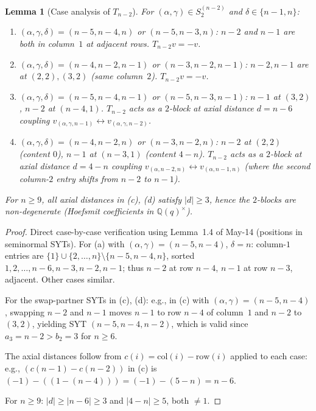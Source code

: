 \documentclass[11pt]{article}
\newtheorem{lemma}[theorem]{Lemma}
\theoremstyle{definition}
\begin{document}
\begin{lemma}[Case analysis of $T_{n-2}$]\label{lem:Tn2-cases}
For $(\alpha,\gamma)\in S_2^{(n-2)}$ and $\delta\in\{n-1,n\}$:
\begin{enumerate}[leftmargin=2em,topsep=0.3em,itemsep=0.2em,
label=\textup{(\alph*)}]
\item $(\alpha,\gamma,\delta)=(n{-}5,n{-}4,n)$ or
$(n{-}5,n{-}3,n)$: $n-2$ and $n-1$ are both in column~$1$ at
adjacent rows.  $T_{n-2}v=-v$.
\item $(\alpha,\gamma,\delta)=(n{-}4,n{-}2,n{-}1)$ or
$(n{-}3,n{-}2,n{-}1)$: $n-2,n-1$ are at $(2,2),(3,2)$ (same
column~$2$).  $T_{n-2}v=-v$.
\item $(\alpha,\gamma,\delta)=(n{-}5,n{-}4,n{-}1)$ or
$(n{-}5,n{-}3,n{-}1)$: $n-1$ at $(3,2)$, $n-2$ at $(n{-}4,1)$.
$T_{n-2}$ acts as a $2$-block at axial distance $d=n-6$ coupling
$v_{(\alpha,\gamma,n-1)}\leftrightarrow v_{(\alpha,\gamma,n-2)}$.
\item $(\alpha,\gamma,\delta)=(n{-}4,n{-}2,n)$ or
$(n{-}3,n{-}2,n)$: $n-2$ at $(2,2)$ (content $0$), $n-1$ at
$(n{-}3,1)$ (content $4-n$).  $T_{n-2}$ acts as a $2$-block at
axial distance $d=4-n$ coupling
$v_{(\alpha,n-2,n)}\leftrightarrow v_{(\alpha,n-1,n)}$ (where the
second column-$2$ entry shifts from $n-2$ to $n-1$).
\end{enumerate}
For $n\ge 9$, all axial distances in (c), (d) satisfy
$|d|\ge 3$, hence the $2$-blocks are non-degenerate
(Hoefsmit coefficients in $\mathbb{Q}(q)^\times$).
\end{lemma}

\begin{proof}
Direct case-by-case verification using Lemma~1.4 of May-14
(positions in seminormal SYTs).  For (a) with
$(\alpha,\gamma)=(n{-}5,n{-}4)$, $\delta=n$:  column-$1$ entries
are $\{1\}\cup\{2,\ldots,n\}\setminus\{n{-}5,n{-}4,n\}$, sorted
$1,2,\ldots,n{-}6,n{-}3,n{-}2,n{-}1$; thus $n-2$ at row $n-4$,
$n-1$ at row $n-3$, adjacent.  Other cases similar.

For the swap-partner SYTs in (c), (d): e.g., in (c) with
$(\alpha,\gamma)=(n{-}5,n{-}4)$, swapping $n{-}2$ and $n{-}1$
moves $n{-}1$ to row $n-4$ of column~$1$ and $n{-}2$ to $(3,2)$,
yielding SYT $(n{-}5,n{-}4,n{-}2)$, which is valid since
$a_3=n{-}2>b_2=3$ for $n\ge 6$.

The axial distances follow from $c(i)=\mathrm{col}(i)-\mathrm{row}(i)$
applied to each case: e.g., $(c(n{-}1)-c(n{-}2))$ in (c) is
$(-1)-((1-(n-4)))=(-1)-(5-n)=n-6$.

For $n\ge 9$: $|d|\ge|n-6|\ge 3$ and $|4-n|\ge 5$, both $\ne 1$.
\end{proof}
\end{document}
